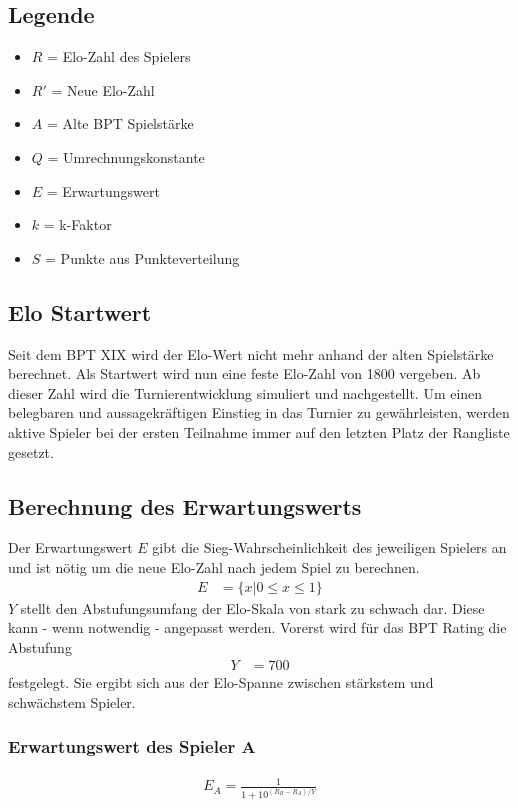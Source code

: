 \documentclass[a4paper, 12pt]{article}
\begin{document}
\subsection{Legende}
\begin{itemize}
\item \(R\) = Elo-Zahl des Spielers
\item \(R'\) = Neue Elo-Zahl
\item \(A\) = Alte BPT Spielstärke
\item \(Q\) = Umrechnungskonstante
\item \(E\) = Erwartungswert
\item \(k\) = k-Faktor
\item \(S\) = Punkte aus Punkteverteilung
\end{itemize}
\subsection{Elo Startwert}
Seit dem BPT XIX wird der Elo-Wert nicht mehr anhand der alten Spielstärke berechnet. Als Startwert wird nun eine feste Elo-Zahl von 1800 vergeben. Ab dieser Zahl wird die Turnierentwicklung simuliert und nachgestellt.
Um einen belegbaren und aussagekräftigen Einstieg in das Turnier zu gewährleisten, werden aktive Spieler bei der ersten Teilnahme immer auf den letzten Platz der Rangliste gesetzt.
\subsection{Berechnung des Erwartungswerts}
Der Erwartungswert \(E\) gibt die Sieg-Wahrscheinlichkeit des jeweiligen Spielers an und ist nötig um die neue Elo-Zahl nach jedem Spiel zu berechnen.
\begin{align}
E&=\{x|0 \leq x \leq 1\}
\end{align}
\(Y\) stellt den Abstufungsumfang der Elo-Skala von stark zu schwach dar. Diese kann - wenn notwendig - angepasst werden. Vorerst wird für das BPT Rating die Abstufung
\begin{align}
Y&=700
\end{align}
festgelegt. Sie ergibt sich aus der Elo-Spanne zwischen stärkstem und schwächstem Spieler.

\subsubsection{Erwartungswert des Spieler A}
\begin{align}
E_{A} = \frac{1}{1+10^{(R_{B}-R_{A})/Y}}
\end{align}
\end{document}
